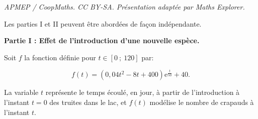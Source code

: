 \documentclass[10pt]{article}
\begin{document}
\noindent\textit{APMEP / CoopMaths. CC BY-SA. Présentation adaptée par Maths Explorer.}\par\medskip
\medskip



Les parties I et II peuvent être abordées de façon indépendante.

\begin{center}\textbf{Partie I : Effet de l'introduction d'une nouvelle espèce.}\end{center}






Soit $f$ la fonction définie pour   $t \in [0~;~120]$ par:

\[f(t) = \left(0,04t^2 - 8t + 400\right)\text{e}^{\frac{t}{50}} + 40.\]

La variable $t$ représente le temps écoulé, en jour, à partir de l'introduction à l'instant $t = 0$ des truites dans le lac, et $f(t)$ modélise le nombre de crapauds à l'instant $t$.

\medskip
\end{document}

